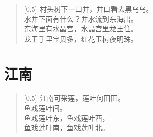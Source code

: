 \documentclass[12pt,UTF-8,openany]{ctexbook}
\begin{document}
\begin{large}
    
    \begin{verse}[0.5\linewidth]
        村头树下一口井，井口看去黑乌乌。 \\
        水井下面有什么？井水流到东海出。 \\
        东海里有水晶宫，水晶宫里龙王住。 \\
        龙王手里宝贝多，红花玉树夜明珠。
    \end{verse}
    
\end{large}


\clearpage

\begin{center}
    
    
\end{center}


\hanzibox{}\hanzibox{}\hanzibox{}\hanzibox{}\hspace{1em}\hanzibox{}\hanzibox{}\hanzibox{}\hanzibox{}

\hanzibox{}\hanzibox{}\hanzibox{}\hanzibox{}\hspace{1em}\hanzibox{}\hanzibox{}\hanzibox{}\hanzibox{}

\hanzibox{}\hanzibox{}\hanzibox{}\hanzibox{}\hspace{1em}\hanzibox{}\hanzibox{}\hanzibox{}\hanzibox{}

\hanzibox{}\hanzibox{}\hanzibox{}\hanzibox{}\hspace{1em}\hanzibox{}\hanzibox{}\hanzibox{}\hanzibox{}






\chapter{江南}

\begin{large}
    
    \begin{verse}[0.5\linewidth]
        江南可采莲，莲叶何田田。 \\
        鱼戏莲叶间。 \\
        鱼戏莲叶东，鱼戏莲叶西， \\
        鱼戏莲叶南，鱼戏莲叶北。
    \end{verse}
    
\end{large}
\end{document}
